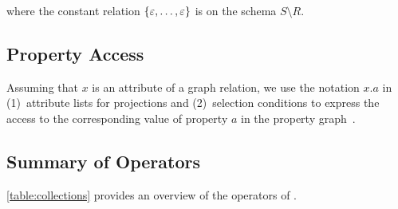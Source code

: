 where the constant relation $\{\varepsilon, \ldots, \varepsilon\}$ is on the schema $S \setminus R$.

\subsection{Property Access}

Assuming that $x$ is an attribute of a graph relation, we use the notation $x.a$ in (1)~attribute lists for projections and (2)~selection conditions to express the access to the corresponding value of property $a$ in the property graph~\cite{DBLP:conf/edbt/HolschG16}.

\subsection{Summary of Operators}

\autoref{table:collections} provides an overview of the operators of \rga.

\newcommand{\propheader}{\multirow{2}{*}{\bf prop.}}
\newcommand{\rgaheader}{\multirow{2}{*}{\breakable{\bf RGA}}}


